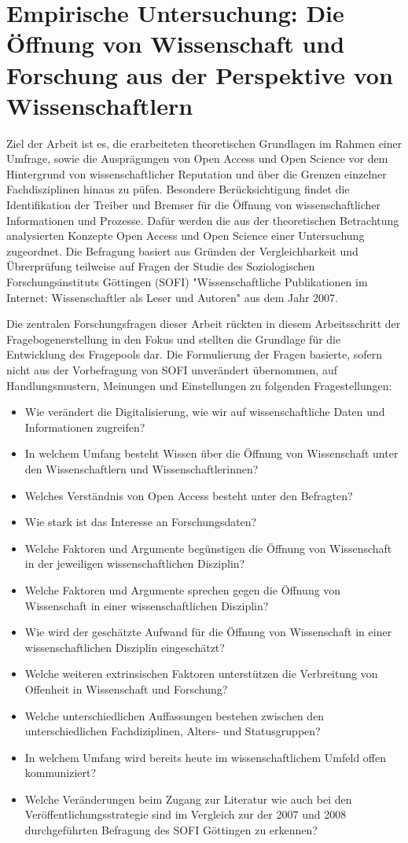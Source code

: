 \chapter{Empirische Untersuchung: Die Öffnung von Wissenschaft und Forschung aus der Perspektive von Wissenschaftlern}

Ziel der Arbeit ist es, die erarbeiteten theoretischen Grundlagen im Rahmen einer Umfrage, sowie die Ausprägungen von Open Access und Open Science vor dem Hintergrund von wissenschaftlicher Reputation und über die Grenzen einzelner Fachdisziplinen hinaus zu püfen. Besondere Berücksichtigung findet die Identifikation der Treiber und Bremser für die Öffnung von wissenschaftlicher Informationen und Prozesse. Dafür werden die aus der theoretischen Betrachtung analysierten Konzepte Open Access und Open Science einer Untersuchung zugeordnet. Die Befragung basiert aus Gründen der Vergleichbarkeit und Übrerprüfung teilweise auf Fragen der Studie des Soziologischen Forschungsinstituts Göttingen (SOFI) "Wissenschaftliche Publikationen im Internet: Wissenschaftler als Leser und Autoren" aus dem Jahr 2007.

Die zentralen Forschungsfragen dieser Arbeit rückten in diesem Arbeitsschritt der Fragebogenerstellung in den Fokus und stellten die Grundlage für die Entwicklung des Fragepools dar. Die Formulierung der Fragen basierte, sofern nicht aus der Vorbefragung von SOFI unverändert übernommen, auf Handlungsmustern, Meinungen und Einstellungen zu folgenden Fragestellungen:
\begin{itemize}
\item Wie verändert die Digitalisierung, wie wir auf wissenschaftliche Daten und Informationen zugreifen?
\item In welchem Umfang besteht Wissen über die Öffnung von Wissenschaft unter den Wissenschaftlern und Wissenschaftlerinnen? 
\item Welches Verständnis von Open Access besteht unter den Befragten? 
\item Wie stark ist das Interesse an Forschungsdaten? 
\item Welche Faktoren und Argumente begünstigen die Öffnung von Wissenschaft in der jeweiligen wissenschaftlichen Disziplin? 
\item Welche Faktoren und Argumente sprechen gegen die Öffnung von Wissenschaft in einer wissenschaftlichen Disziplin? 
\item Wie wird der geschätzte Aufwand für die Öffnung von Wissenschaft in einer wissenschaftlichen Disziplin eingeschätzt?
\item Welche weiteren extrinsischen Faktoren unterstützen die Verbreitung von Offenheit in Wissenschaft und Forschung? 
\item Welche unterschiedlichen Auffassungen bestehen zwischen den unterschiedlichen Fachdiziplinen, Alters- und Statusgruppen?
\item In welchem Umfang wird bereits heute im wissenschaftlichem Umfeld offen kommuniziert?
\item Welche Veränderungen beim Zugang zur Literatur wie auch bei den Veröffentlichungsstrategie sind im Vergleich zur der 2007 und 2008 durchgeführten Befragung des SOFI Göttingen zu erkennen?
\end{itemize}

